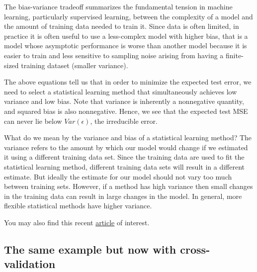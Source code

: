 \documentclass[%
oneside,                 %
final,                   %
10pt]{article}
\begin{document}
The bias-variance tradeoff summarizes the fundamental tension in
machine learning, particularly supervised learning, between the
complexity of a model and the amount of training data needed to train
it.  Since data is often limited, in practice it is often useful to
use a less-complex model with higher bias, that is  a model whose asymptotic
performance is worse than another model because it is easier to
train and less sensitive to sampling noise arising from having a
finite-sized training dataset (smaller variance). 



The above equations tell us that in
order to minimize the expected test error, we need to select a
statistical learning method that simultaneously achieves low variance
and low bias. Note that variance is inherently a nonnegative quantity,
and squared bias is also nonnegative. Hence, we see that the expected
test MSE can never lie below $Var(\epsilon)$, the irreducible error.


What do we mean by the variance and bias of a statistical learning
method? The variance refers to the amount by which our model would change if we
estimated it using a different training data set. Since the training
data are used to fit the statistical learning method, different
training data sets  will result in a different estimate. But ideally the
estimate for our model should not vary too much between training
sets. However, if a method has high variance  then small changes in
the training data can result in large changes in the model. In general, more
flexible statistical methods have higher variance.


You may also find this recent \href{{https://www.pnas.org/content/116/32/15849}}{article} of interest.



\subsection*{The same example but now with cross-validation}
\end{document}
